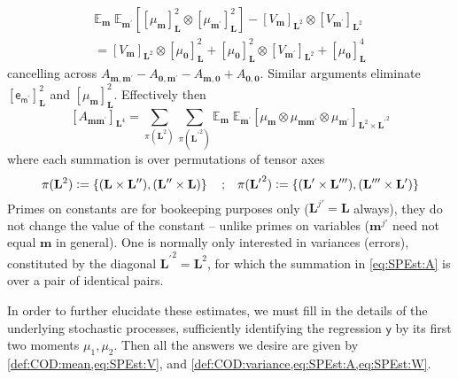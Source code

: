 \documentclass[preprint,12pt]{elsarticle}
\newcommand*{\M}[1]{\ensuremath{#1}\xspace}
\newcommand*{\x}{\times}
\newcommand*{\mi}[1]{\mathbf{#1}}
\newcommand*{\rv}[1]{\mathsf{#1}}
\newcommand*{\te}[2][]{\left\lbrack{#2}\right\rbrack_{#1}}
\newcommand*{\deq}{\M{\mathrel{\mathop:}=}}
\newcommand{\T}[1]{\text{#1}}
\newcommand*{\QT}[2][]{\M{\quad\T{#2}\ifthenelse{\equal{#1}{}}{\quad}{#1}}}
\newcommand*{\ev}[3][]{\mathbb{E}_{#3}^{#1}\!\left\lbrack{#2}\right\rbrack}
\newcommand*{\evt}[3][]{\mathbb{E}_{#3}^{#1}\!#2}
\newcommand*{\set}[1]{\M{\left\lbrace{#1}\right\rbrace}}
\begin{document}
    \begin{multline*}
        \evt{\;\ev{\te[\mi{L}]{\mu_{\mi{m}}}^{2} \otimes \te[\mi{L}]{\mu_{\mi{m^{\prime}}}}^{2}}{\mi{m^{\prime}}}}{\mi{m}}
        - \te[\mi{L}^2]{V_{\mi{m}}}\otimes \te[\mi{L}^2]{V_{\mi{m^{\prime}}}} \\
        = \te[\mi{L}^2]{V_{\mi{m}}}\otimes \te[\mi{L}]{\mu_{\mi{0}}}^{2}
        + \te[\mi{L}]{\mu_{\mi{0}}}^{2}\otimes \te[\mi{L}^2]{V_{\mi{m^{\prime}}}}
        + \te[\mi{L}]{\mu_{\mi{0}}}^{4}
    \end{multline*}
    cancelling across $A_{\mi{m,m^{\prime}}}-A_{\mi{0,m^{\prime}}} - A_{\mi{m,0}}+A_{\mi{0,0}}$.
    Similar arguments eliminate $\te[\mi{L}]{\rv{e_{m^{\prime}}}}^{2}$ and $\te[\mi{L}]{\mu_{\mi{m}}}^{2}$.
    Effectively then
    \begin{equation}\label{eq:SPEst:A}
        \te[\mi{L}^4]{A_{\mi{mm^{\prime}}}} = \sum_{\pi(\mi{L}^{2})} \sum_{\pi(\mi{L^{\prime}}^{2})}
        \evt{\;\evt{\te[\mi{L}^{2} \x \mi{L^{\prime}}^{2}]{\mu_{\mi{m}} \otimes \mu_{\mi{mm^{\prime}}} \otimes \mu_{\mi{m^{\prime}}}}}{\mi{m^{\prime}}}}{\mi{m}}
    \end{equation}
    where each summation is over permutations of tensor axes
    \begin{equation*}
        \pi(\mi{L}^{2}) \deq \set{(\mi{L}\x\mi{L^{\prime\prime}}), (\mi{L^{\prime\prime}}\x\mi{L})} \QT{;} \pi(\mi{L^{\prime}}^{2}) \deq \set{(\mi{L^{\prime}}\x\mi{L^{\prime\prime\prime}}), (\mi{L^{\prime\prime\prime}}\x\mi{L^{\prime}})}
    \end{equation*}
    Primes on constants are for bookeeping purposes only ($\mi{L}^{j\prime} = \mi{L}$ always), they do not change the value of the constant -- unlike primes on variables ($\mi{m}^{j\prime}$ need not equal $\mi{m}$ in general). One is normally only interested in variances (errors), constituted by the diagonal $\mi{L^{\prime}}^{2}=\mi{L}^{2}$, for which the summation in \cref{eq:SPEst:A} is over a pair of identical pairs.

    In order to further elucidate these estimates, we must fill in the details of the underlying stochastic processes, sufficiently identifying the regression $\rv{y}$ by its first two moments $\mu_{1}, \mu_{2}$. Then all the answers we desire are given by \cref{def:COD:mean,eq:SPEst:V}, and \cref{def:COD:variance,eq:SPEst:A,eq:SPEst:W}.
\end{document}
